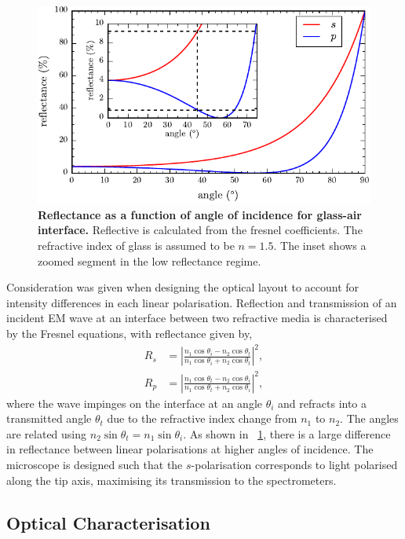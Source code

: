 \documentclass[12pt, a4paper, twoside]{book}
\begin{document}
\begin{figure}[bt]
\centering
\includegraphics{figures/fresnel_coefficients}
\caption*
{\textbf{Reflectance as a function of angle of incidence for glass-air interface.} Reflective is calculated from the fresnel coefficients. The refractive index of glass is assumed to be $n=1.5$. The inset shows a zoomed segment in the low reflectance regime.}
\label{fig:fresnel}
\end{figure}

Consideration was given when designing the optical layout to account for intensity differences in each linear polarisation. Reflection and transmission of an incident EM wave at an interface between two refractive media is characterised by the Fresnel equations, with reflectance given by,
\begin{align}
R_s &= \left| \frac{n_1\cos{\theta_i} - n_2\cos{\theta_t}}{n_1\cos{\theta_i} + n_2\cos{\theta_t}} \right|^2, \\
R_p &= \left| \frac{n_1\cos{\theta_t} - n_2\cos{\theta_i}}{n_1\cos{\theta_t} + n_2\cos{\theta_i}} \right|^2,
\end{align}
where the wave impinges on the interface at an angle $\theta_i$ and refracts into a transmitted angle $\theta_t$ due to the refractive index change from $n_1$ to $n_2$. The angles are related using $n_2\sin{\theta_t} = n_1\sin{\theta_i}$. As shown in \figurename~\ref{fig:fresnel}, there is a large difference in reflectance between linear polarisations at higher angles of incidence. The microscope is designed such that the $s$-polarisation corresponds to light polarised along the tip axis, maximising its transmission to the spectrometers.

\subsection{Optical Characterisation}
\end{document}
